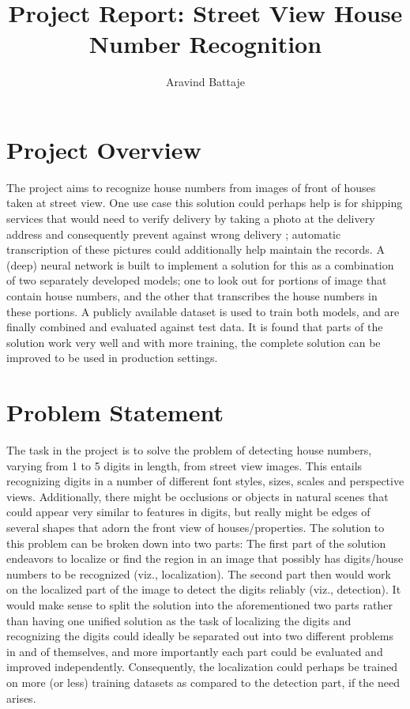 \documentclass{article}
\begin{document}
	
	\title{Project Report: Street View House Number Recognition}
	\author{Aravind Battaje}
	\maketitle
	
	\section{Project Overview}
	The project aims to recognize house numbers from images of front of houses taken at street view. One use case this solution could perhaps help is for shipping services that would need to verify delivery by taking a photo at the delivery address and consequently prevent against wrong delivery \cite{news-wrong-address-delivery}; automatic transcription of these pictures could additionally help maintain the records. A (deep) neural network is built to implement a solution for this as a combination of two separately developed models; one to look out for portions of image that contain house numbers, and the other that transcribes the house numbers in these portions. A publicly available dataset \cite{svhn-dataset} is used to train both models, and are finally combined and evaluated against test data. It is found that parts of the solution work very well and with more training, the complete solution can be improved to be used in production settings.
	
	\section{Problem Statement}\label{problem-statement}
	The task in the project is to solve the problem of detecting house numbers, varying from 1 to 5 digits in length, from street view images. This entails recognizing digits in a number of different font styles, sizes, scales and perspective views. Additionally, there might be occlusions or objects in natural scenes that could appear very similar to features in digits, but really might be edges of several shapes that adorn the front view of houses/properties. The solution to this problem can be broken down into two parts: The first part of the solution endeavors to localize or find the region in an image that possibly has digits/house numbers to be recognized (viz., localization). The second part then would work on the localized part of the image to detect the digits reliably (viz., detection). It would make sense to split the solution into the aforementioned two parts rather than having one unified solution as the task of localizing the digits and recognizing the digits could ideally be separated out into two different problems in and of themselves, and more importantly each part could be evaluated and improved independently. Consequently, the localization could perhaps be trained on more (or less) training datasets as compared to the detection part, if the need arises.
	
\end{document}
